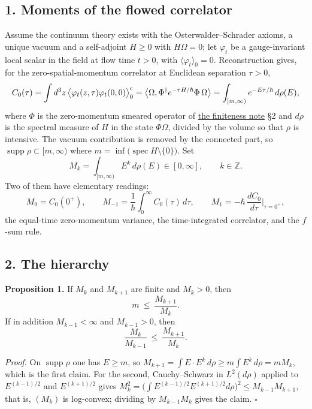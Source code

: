 \documentclass[11pt,a4paper]{article}
\begin{document}
\hypertarget{moments-of-the-flowed-correlator}{%
\subsection{1. Moments of the flowed
correlator}\label{moments-of-the-flowed-correlator}}

Assume the continuum theory exists with the Osterwalder--Schrader
axioms, a unique vacuum and a self-adjoint \(H\ge0\) with \(H\Omega=0\);
let \(\varphi_t\) be a gauge-invariant local scalar in the field at flow
time \(t>0\), with \(\langle\varphi_t\rangle_0=0\). Reconstruction
gives, for the zero-spatial-momentum correlator at Euclidean separation
\(\tau>0\),
\[C_0(\tau)=\int d^3z\,\big\langle\varphi_t(z,\tau)\varphi_t(0,0)\big\rangle^{\rm c}_0
=\big\langle\Omega,\Phi^\dagger e^{-\tau H/\hbar}\Phi\,\Omega\big\rangle
=\int_{[m,\infty)}e^{-E\tau/\hbar}\,d\rho(E),\] where \(\Phi\) is the
zero-momentum smeared operator of
\href{finiteness-half-flowed-susceptibility.md}{the finiteness note} §2
and \(d\rho\) is the spectral measure of \(H\) in the state
\(\Phi\Omega\), divided by the volume so that \(\rho\) is intensive. The
vacuum contribution is removed by the connected part, so
\(\operatorname{supp}\rho\subset[m,\infty)\) where
\(m=\inf\big(\operatorname{spec}H\setminus\{0\}\big)\). Set
\[M_k=\int_{[m,\infty)}E^k\,d\rho(E)\in[0,\infty],\qquad k\in\mathbb Z .\]
Two of them have elementary readings: \[M_0=C_0(0^+),\qquad
M_{-1}=\frac1\hbar\int_0^\infty C_0(\tau)\,d\tau,\qquad
M_{1}=-\hbar\,\frac{dC_0}{d\tau}\Big|_{\tau=0^+},\] the equal-time
zero-momentum variance, the time-integrated correlator, and the
\(f\)-sum rule.

\hypertarget{the-hierarchy}{%
\subsection{2. The hierarchy}\label{the-hierarchy}}

\textbf{Proposition 1.} If \(M_k\) and \(M_{k+1}\) are finite and
\(M_k>0\), then \[m\ \le\ \frac{M_{k+1}}{M_k}.\] If in addition
\(M_{k-1}<\infty\) and \(M_{k-1}>0\), then
\[\frac{M_k}{M_{k-1}}\ \le\ \frac{M_{k+1}}{M_k}.\]

\emph{Proof.} On \(\operatorname{supp}\rho\) one has \(E\ge m\), so
\(M_{k+1}=\int E\cdot E^k\,d\rho\ge m\int E^k\,d\rho=mM_k\), which is
the first claim. For the second, Cauchy--Schwarz in \(L^2(d\rho)\)
applied to \(E^{(k-1)/2}\) and \(E^{(k+1)/2}\) gives
\(M_k^2=\big(\int E^{(k-1)/2}E^{(k+1)/2}d\rho\big)^2\le M_{k-1}M_{k+1}\),
that is, \((M_k)\) is log-convex; dividing by \(M_{k-1}M_k\) gives the
claim. \(\square\)
\end{document}
